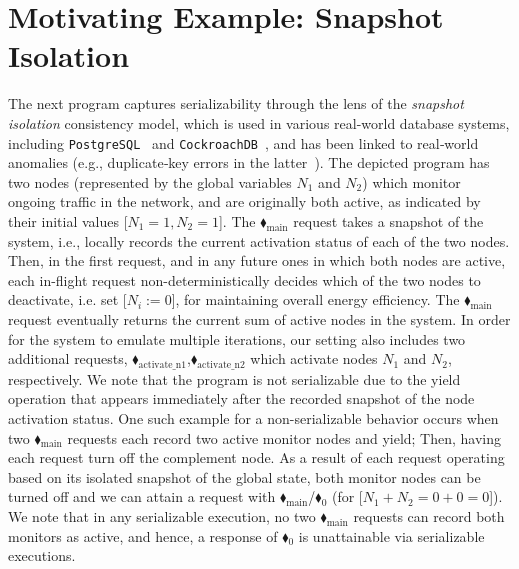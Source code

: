 \appendix

\section{Motivating Example: Snapshot Isolation}
\label{appendix:snapshotIsolationExample}



The next program captures serializability through the lens of the \textit{snapshot isolation} consistency model, which is used in various real-world database systems, including \texttt{PostgreSQL}~\cite{postgresql-transaction-iso} and \texttt{CockroachDB}~\cite{cockroachdb-si-docs}, and has been linked to real‐world anomalies (e.g., duplicate‐key errors in the latter~\cite{cockroach-issue-14099}).
%
The depicted program has two nodes (represented by the global variables $N_1$ and $N_2$) which monitor ongoing traffic in the network, and are originally both active, as indicated by their initial values [$N_1=1,N_2=1$].
%
The {\color{ForestGreen}$\blacklozenge_\text{main}$} request takes a snapshot of the system, i.e., locally records the current activation status of each of the two nodes.
%
Then, in the first request, and in any future ones in which both nodes are active, each in-flight request non-deterministically decides which of the two nodes to deactivate, i.e. set [$N_i:=0$], for maintaining overall energy efficiency.
%
The {\color{ForestGreen}$\blacklozenge_\text{main}$} request eventually returns the current sum of active nodes in the system.
%
In order for the system to emulate multiple iterations, our setting also includes two additional requests, {\color{ForestGreen}$\blacklozenge_\text{activate\_n1}$},{\color{ForestGreen}$\blacklozenge_\text{activate\_n2}$} which activate nodes $N_1$ and $N_2$, respectively.
%
We note that the program is not serializable due to the yield operation that appears immediately after the recorded snapshot of the node activation status. One such example for a non-serializable behavior occurs when two {\color{ForestGreen}$\blacklozenge_\text{main}$} requests each record two active monitor nodes and yield; Then, having each request turn off the complement node. As a result of each request operating based on its isolated snapshot of the global state, both monitor nodes can be turned off and we can attain a request with {\color{ForestGreen}$\blacklozenge_\text{main}$}/{\color{red}$\blacklozenge_0$} (for [$N_1+N_2=0+0=0$]).
%
We note that in any serializable execution, no two {\color{ForestGreen}$\blacklozenge_\text{main}$} requests can record both monitors as active, and hence, a response of {\color{red}$\blacklozenge_0$} is unattainable via serializable executions.




